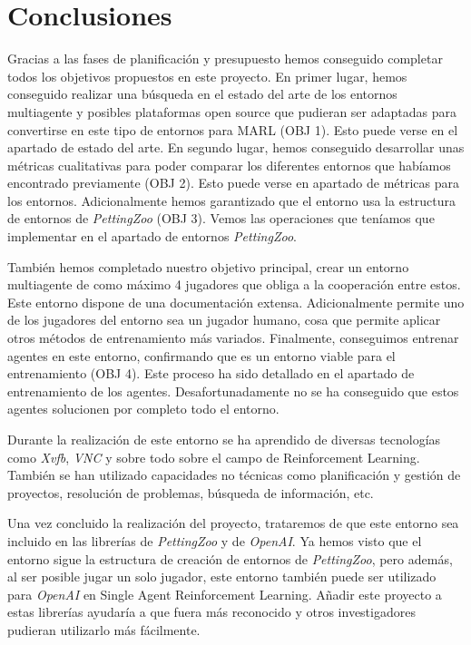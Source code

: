 \chapter{Conclusiones}

\label{section:Conclusiones}

Gracias a las fases de planificación y presupuesto hemos conseguido completar todos los objetivos propuestos en este proyecto. En primer lugar, hemos conseguido realizar una búsqueda en el estado del arte de los entornos multiagente y posibles plataformas open source que pudieran ser adaptadas para convertirse en este tipo de entornos para MARL (OBJ 1). Esto puede verse en el apartado de estado del arte. En segundo lugar, hemos conseguido desarrollar unas métricas cualitativas para poder comparar los diferentes entornos que habíamos encontrado previamente (OBJ 2). Esto puede verse en apartado de métricas para los entornos. Adicionalmente hemos garantizado que el entorno usa la estructura de entornos de \textit{PettingZoo} (OBJ 3). Vemos las operaciones que teníamos que implementar en el apartado de entornos \textit{PettingZoo}. 

También hemos completado nuestro objetivo principal, crear un entorno multiagente de como máximo 4 jugadores que obliga a la cooperación entre estos. Este entorno dispone de una documentación extensa. Adicionalmente permite uno de los jugadores del entorno sea un jugador humano, cosa que permite aplicar otros métodos de entrenamiento más variados. Finalmente, conseguimos entrenar agentes en este entorno, confirmando que es un entorno viable para el entrenamiento (OBJ 4). Este proceso ha sido detallado en el apartado de entrenamiento de los agentes. Desafortunadamente no se ha conseguido que estos agentes solucionen por completo todo el entorno.


Durante la realización de este entorno se ha aprendido de diversas tecnologías como \textit{Xvfb}, \textit{VNC} y sobre todo sobre el campo de Reinforcement Learning. También se han utilizado capacidades no técnicas como planificación y gestión de proyectos, resolución de problemas, búsqueda de información, etc.

Una vez concluido la realización del proyecto, trataremos de que este entorno sea incluido en las librerías de \textit{PettingZoo} y de \textit{OpenAI}. Ya hemos visto que el entorno sigue la estructura de creación de entornos de \textit{PettingZoo}, pero además, al ser posible jugar un solo jugador, este entorno también puede ser utilizado para \textit{OpenAI} en Single Agent Reinforcement Learning. Añadir este proyecto a estas librerías ayudaría a que fuera más reconocido y otros investigadores pudieran utilizarlo más fácilmente.